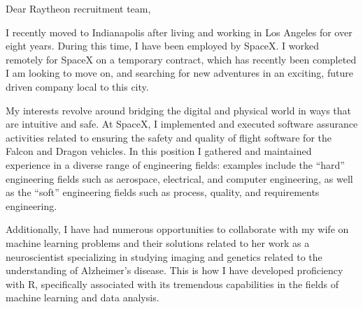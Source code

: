 \begin{cvletter}


Dear Raytheon recruitment team,

I recently moved to Indianapolis after living and working in Los Angeles for
over eight years. During this time, I have been employed by SpaceX. I worked
remotely for SpaceX on a temporary contract, which has recently been completed I
am looking to move on, and searching for new adventures in an exciting, future
driven company local to this city.

My interests revolve around bridging the digital and physical world in ways that
are intuitive and safe. At SpaceX, I implemented and executed software assurance
activities related to ensuring the safety and quality of flight software for the
Falcon and Dragon vehicles. In this position I gathered and maintained
experience in a diverse range of engineering fields: examples include the
``hard'' engineering fields such as aerospace, electrical, and computer
engineering, as well as the ``soft'' engineering fields such as process,
quality, and requirements engineering.

Additionally, I have had numerous opportunities to collaborate with my wife on
machine learning problems and their solutions related to her work as a
neuroscientist specializing in studying imaging and genetics related to the
understanding of Alzheimer's disease. This is how I have developed proficiency
with R, specifically associated with its tremendous capabilities in the fields
of machine learning and data analysis.







\end{cvletter}

